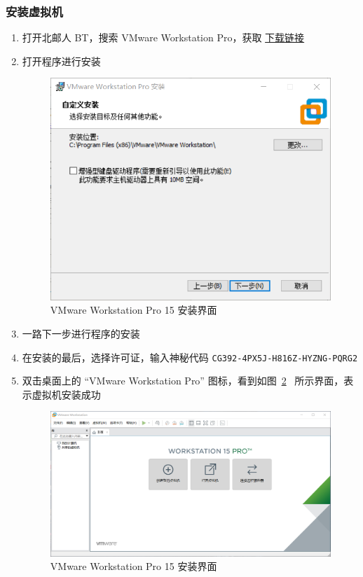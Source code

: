 \documentclass[blue,normal,cn]{elegantnote}
\newcommand{\code}[1]{\colorbox{light-gray}{\texttt{#1}}}
\begin{document}
\subsubsection{安装虚拟机}
\begin{enumerate}
  \item 打开北邮人 BT，搜索 VMware Workstation Pro，获取
  \href{https://bt.byr.cn/details.php?id=284764&hit=1}{下载链接}
  \item 打开程序进行安装
  \begin{figure}[!htbp]
    \centering
    \includegraphics[width=.8\textwidth]{fig/lab-1/fig1-1}
    \caption{VMware Workstation Pro 15 安装界面}
    \label{fig:VMwareInstall}
  \end{figure}
  \item 一路下一步进行程序的安装
  \item 在安装的最后，选择许可证，输入神秘代码 \code{CG392-4PX5J-H816Z-HYZNG-PQRG2}
  \item 双击桌面上的 ``VMware Workstation Pro'' 图标，看到如图~\ref{fig:VMwareMain}~
  所示界面，表示虚拟机安装成功
  \begin{figure}[!htbp]
    \centering
    \includegraphics[width=.8\textwidth]{fig/lab-1/fig1-2}
    \caption{VMware Workstation Pro 15 安装界面}
    \label{fig:VMwareMain}
  \end{figure}
\end{enumerate}
\end{document}
